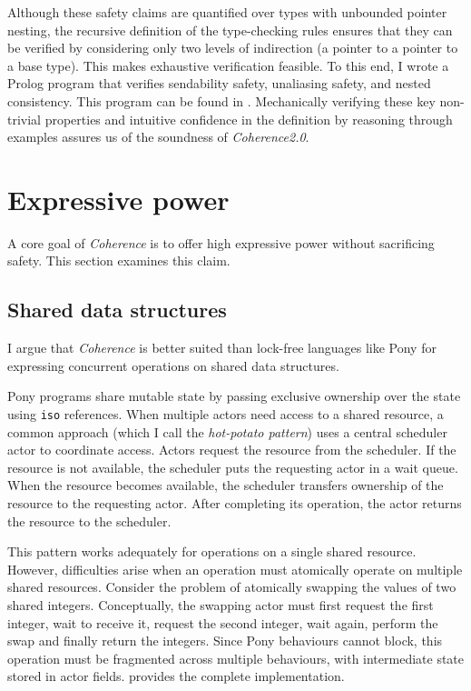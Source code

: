 Although these safety claims are quantified over types with unbounded pointer nesting, the recursive definition of the type-checking rules ensures that they can be verified by considering only two levels of indirection (a pointer to a pointer to a base type). This makes exhaustive verification feasible. To this end, I wrote a Prolog program that verifies sendability safety, unaliasing safety, and nested consistency. This program can be found in . Mechanically verifying these key non-trivial properties and intuitive confidence in the definition by reasoning through examples assures us of the soundness of \textit{Coherence2.0}.

\section{Expressive power}
A core goal of \textit{Coherence} is to offer high expressive power without sacrificing safety. This section examines this claim.

\subsection{Shared data structures} \label{sec:pony_expressive_power}
I argue that \textit{Coherence} is better suited than lock-free languages like Pony for expressing concurrent operations on shared data structures. 

Pony programs share mutable state by passing exclusive ownership over the state using \texttt{iso} references. When multiple actors need access to a shared resource, a common approach (which I call the \textit{hot-potato pattern}) uses a central scheduler actor to coordinate access. Actors request the resource from the scheduler. If the resource is not available, the scheduler puts the requesting actor in a wait queue. When the resource becomes available, the scheduler transfers ownership of the resource to the requesting actor. After completing its operation, the actor returns the resource to the scheduler.

This pattern works adequately for operations on a single shared resource. However, difficulties arise when an operation must atomically operate on multiple shared resources. Consider the problem of atomically swapping the values of two shared integers. Conceptually, the swapping actor must first request the first integer, wait to receive it, request the second integer, wait again, perform the swap and finally return the integers. Since Pony behaviours cannot block, this operation must be fragmented across multiple behaviours, with intermediate state stored in actor fields.  provides the complete implementation.

